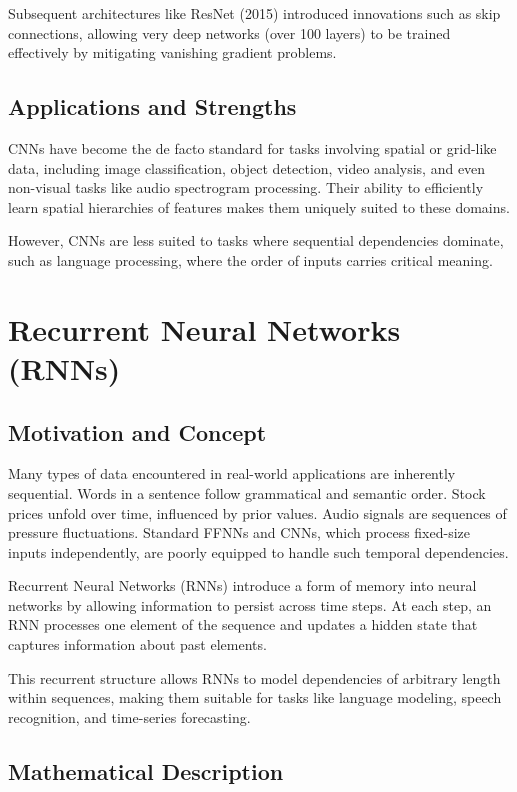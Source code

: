 \documentclass[openany]{book}
\begin{document}
Subsequent architectures like ResNet (2015) introduced innovations such as skip 
connections, allowing very deep networks (over 100 layers) to be trained 
effectively by mitigating vanishing gradient problems.

\subsection{Applications and Strengths}

CNNs have become the de facto standard for tasks involving spatial or grid-like 
data, including image classification, object detection, video analysis, and even
non-visual tasks like audio spectrogram processing. Their ability to efficiently 
learn spatial hierarchies of features makes them uniquely suited to these 
domains.

However, CNNs are less suited to tasks where sequential dependencies dominate, 
such as language processing, where the order of inputs carries critical meaning.

\section{Recurrent Neural Networks (RNNs)}

\subsection{Motivation and Concept}

Many types of data encountered in real-world applications are inherently 
sequential. Words in a sentence follow grammatical and semantic order. Stock 
prices unfold over time, influenced by prior values. Audio signals are sequences
 of pressure fluctuations. Standard FFNNs and CNNs, which process fixed-size 
 inputs independently, are poorly equipped to handle such temporal dependencies.

Recurrent Neural Networks (RNNs) introduce a form of memory into neural networks 
by allowing information to persist across time steps. At each step, an RNN 
processes one element of the sequence and updates a hidden state that captures 
information about past elements.

This recurrent structure allows RNNs to model dependencies of arbitrary length 
within sequences, making them suitable for tasks like language modeling, speech 
recognition, and time-series forecasting.

\subsection{Mathematical Description}
\end{document}
